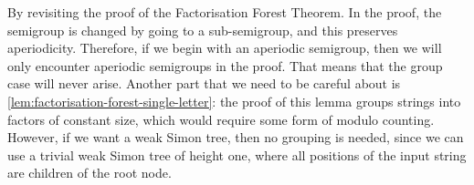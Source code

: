 {
    By revisiting the proof of the Factorisation Forest Theorem. In the proof, the semigroup is changed by going to a sub-semigroup, and this preserves aperiodicity. Therefore, if we begin with an aperiodic semigroup, then we will only encounter aperiodic semigroups in the proof. That means that the group case will never arise. Another part that we need to be careful about is \cref{lem:factorisation-forest-single-letter}: the proof of this lemma groups strings into factors of constant size, which would require some form of modulo counting. However, if we want a weak Simon tree, then no grouping is needed, since we can use a trivial weak Simon tree of height one, where all positions of the input string are children of the root node.
 }

